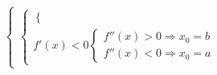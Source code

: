 \[{\begin{cases}
\begin{cases}
\begin{cases}
                                \end{cases}
                                \\
                                f'(x) < 0
                                \begin{cases}
                                        f''(x) > 0 \Rightarrow x_0 = b
                                        \\
                                        f''(x) < 0 \Rightarrow x_0 = a
                                \end{cases}
                        \end{cases}
                \end{cases}}
\]